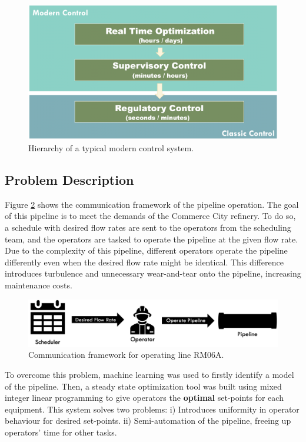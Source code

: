 \begin{figure}[h]
    \centering
    \includegraphics[scale=0.15]{images/08APC.png}
    \caption{Hierarchy of a typical modern control system.}
    \label{fig:08APC}
\end{figure}

\subsection{Problem Description}
Figure \ref{fig:08schedule} shows the communication framework of the pipeline operation. The goal of this pipeline is to meet the demands of the Commerce City refinery. To do so, a schedule with desired flow rates are sent to the operators from the scheduling team, and the operators are tasked to operate the pipeline at the given flow rate. Due to the complexity of this pipeline, different operators operate the pipeline differently even when the desired flow rate might be identical.  This difference introduces turbulence and unnecessary wear-and-tear onto the pipeline, increasing maintenance costs. 

\begin{figure}[h]
    \centering
    \includegraphics[scale=0.35]{images/08Schedule.png}
    \caption{Communication framework for operating line RM06A.}
    \label{fig:08schedule}
\end{figure}

To overcome this problem, machine learning was used to firstly identify a model of the pipeline.  Then, a steady state optimization tool was built using mixed integer linear programming to give operators the \textbf{optimal} set-points for each equipment.  This system solves two problems: i) Introduces uniformity in operator behaviour for desired set-points. ii) Semi-automation of the pipeline, freeing up operators' time for other tasks.

